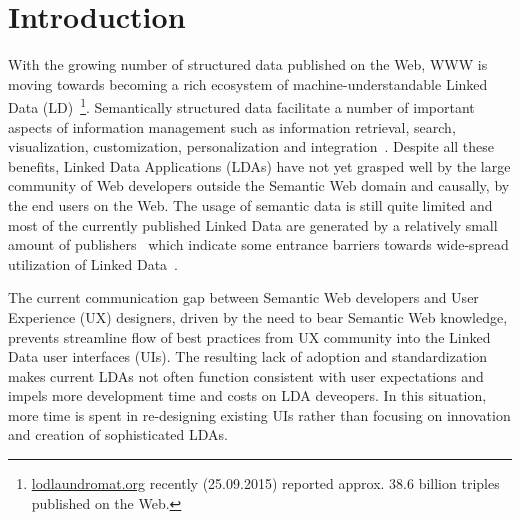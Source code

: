 \documentclass{acm_proc_article-sp}
\begin{document}




\section{Introduction}


With the growing number of structured data published on the Web, WWW is moving towards becoming a rich ecosystem of machine-understandable Linked Data (LD)~\footnote{\url{lodlaundromat.org} recently (25.09.2015) reported approx. 38.6 billion triples published on the Web.}.
Semantically structured data facilitate a number of important aspects of
information management such as information retrieval, search, visualization,  customization, personalization and integration~\cite{SCAJ-Khalili-2013}.
Despite all these benefits, Linked Data Applications (LDAs) have not yet grasped well by the large community of Web developers outside the Semantic Web domain and causally, by the end users on the Web.
The usage of semantic data is still quite limited and most of the currently published Linked Data are generated by a relatively small amount of publishers~\cite{ontowiki-swj} which indicate some entrance barriers towards wide-spread utilization of Linked Data~\cite{StegemannZ14}.

The current communication gap between Semantic Web developers and User Experience (UX) designers, driven by the need to bear Semantic Web knowledge, prevents streamline flow of best practices from UX community into the Linked Data user interfaces (UIs).
The resulting lack of adoption and standardization makes current LDAs not often function consistent with user expectations and impels more development time and costs on LDA deveopers.
In this situation, more time is spent in re-designing existing UIs rather than focusing on innovation and creation of sophisticated LDAs.
 
\end{document}
